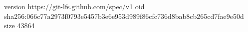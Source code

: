 version https://git-lfs.github.com/spec/v1
oid sha256:066c77a2973f0793e5457b3e6e953d989f86cfc736d8bab8cb265cd7fae9e50d
size 43864
